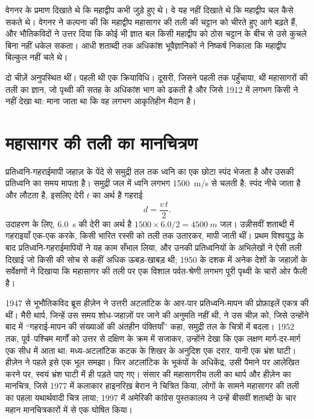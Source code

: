 वेगनर के प्रमाण दिखाते थे कि महाद्वीप कभी जुड़े हुए थे। वे यह नहीं
दिखाते थे कि महाद्वीप चल कैसे सकते थे। वेगनर ने कल्पना की कि महाद्वीप
महासागर की तली की चट्टान को चीरते हुए आगे बढ़ते हैं, और भौतिकविदों ने उत्तर दिया कि कोई भी ज्ञात बल किसी महाद्वीप को ठोस
चट्टान के बीच से उसे कुचले बिना नहीं धकेल सकता। आधी शताब्दी तक अधिकांश भूवैज्ञानिकों ने निष्कर्ष निकाला कि
महाद्वीप बिल्कुल नहीं चले थे।

दो चीज़ें अनुपस्थित थीं। पहली थी एक क्रियाविधि। दूसरी, जिसने
पहली तक पहुँचाया, थी महासागरों की तली का ज्ञान, जो पृथ्वी की सतह के अधिकांश भाग
को ढकती है और जिसे 1912 में लगभग किसी ने नहीं देखा था: माना जाता था कि वह
लगभग आकृतिहीन मैदान है।

\section{महासागर की तली का मानचित्रण}

प्रतिध्वनि-गहराईमापी जहाज़ के पेंदे से समुद्री तल तक ध्वनि का एक छोटा स्पंद भेजता है
और उसकी प्रतिध्वनि का समय मापता है। समुद्री जल में ध्वनि लगभग
\qty{1500}{m/s} से चलती है; स्पंद नीचे जाता है और लौटता है, इसलिए देरी $t$ का अर्थ है
गहराई
\[
  d = \frac{v\,t}{2}.
\]
उदाहरण के लिए, \qty{6.0}{s} की देरी का अर्थ है $1500 \times 6.0/2 =
\qty{4500}{m}$ जल। उन्नीसवीं शताब्दी में गहराइयाँ एक-एक करके, किसी भारित
रस्सी को तली तक उतारकर, मापी जाती थीं। प्रथम विश्वयुद्ध के
बाद प्रतिध्वनि-गहराईमापियों ने यह काम सँभाल लिया, और उनकी प्रतिध्वनियों के अभिलेखों ने ऐसी तली दिखाई
जो किसी की सोच से कहीं अधिक ऊबड़-खाबड़ थी; 1950 के दशक में अनेक देशों के जहाज़ों के सर्वेक्षणों ने दिखाया कि
महासागर की तली पर एक विशाल पर्वत-श्रेणी लगभग पूरी पृथ्वी के चारों ओर
फैली है।

\begin{history}[मैरी थार्प और भ्रंश घाटी, 1952]
1947 से भूभौतिकविद ब्रूस हीज़ेन ने उत्तरी अटलांटिक के आर-पार प्रतिध्वनि-मापन
की प्रोफ़ाइलें एकत्र की थीं। मैरी थार्प, जिन्हें उस समय शोध-जहाज़ों पर जाने की
अनुमति नहीं थी, ने उस चीज़ को, जिसे उन्होंने बाद में ``गहराई-मापन की संख्याओं की
अंतहीन पंक्तियाँ'' कहा, समुद्री तल के चित्रों में बदला। 1952 तक, पूर्व--पश्चिम
मार्गों को उत्तर से दक्षिण के क्रम में सजाकर, उन्होंने देखा कि एक लक्षण
मार्ग-दर-मार्ग एक सीध में आता था: मध्य-अटलांटिक कटक के शिखर के अनुदिश एक दरार, यानी एक भ्रंश
घाटी। हीज़ेन ने पहले इसे एक भूल समझा। फिर अटलांटिक के भूकंपों के
अधिकेंद्र, उसी पैमाने पर आलेखित करने पर, स्वयं
भ्रंश घाटी में ही पड़ते पाए गए। संसार की महासागरीय तली का थार्प और हीज़ेन का मानचित्र,
जिसे 1977 में कलाकार हाइनरिख़ बेरान ने चित्रित किया, लोगों के सामने महासागर की तली का पहला यथार्थवादी चित्र लाया; 1997 में
अमेरिकी कांग्रेस पुस्तकालय ने उन्हें बीसवीं शताब्दी के चार महान मानचित्रकारों में
से एक घोषित किया।
\end{history}

